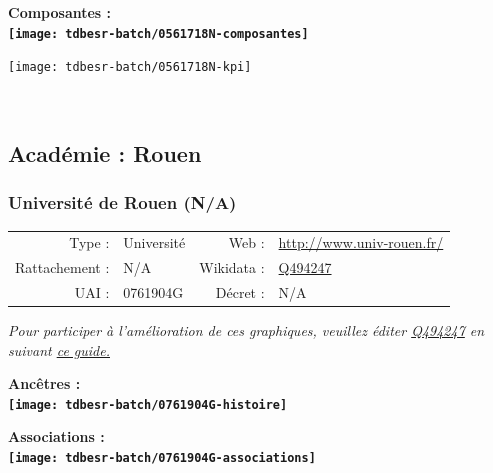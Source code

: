 \documentclass[12pt,french,]{article}
\begin{document}
\begin{center} \bf Composantes : \\  
\texttt{[image: tdbesr-batch/0561718N-composantes]} \end{center}

\begin{center}\texttt{[image: tdbesr-batch/0561718N-kpi]} \end{center}\checkoddpage

\ifoddpage ~\newpage \fi   

\hypertarget{acaduxe9mie-rouen}{%
\subsection{Académie : Rouen}\label{acaduxe9mie-rouen}}

\hypertarget{universituxe9-de-rouen-na}{%
\subsubsection{Université de Rouen
(N/A)}\label{universituxe9-de-rouen-na}}

\begin{tabular*}{\textwidth}{rp{5cm}rl}  
\hline  
Type : & Université & Web : &\href{http://www.univ-rouen.fr/}{http://www.univ-rouen.fr/} \\  
Rattachement : & N/A & Wikidata : & \href{https://www.wikidata.org/entity/Q494247}{Q494247} \\  
UAI : & 0761904G & Décret : & N/A \\  
\hline  
\end{tabular*}

\textit{\scriptsize Pour participer à l'amélioration de ces graphiques, veuillez éditer  \href{https://www.wikidata.org/entity/Q494247}{Q494247}  en suivant \href{https://github.com/cpesr/wikidataESR/blob/master/Rmd/wikidataESR.md}{ce guide.}}

\vspace{1cm}  
\begin{minipage}[b]{0.50\textwidth}\begin{center} \bf Ancêtres : \\  
\texttt{[image: tdbesr-batch/0761904G-histoire]} \end{center}\end{minipage}\begin{minipage}[b]{0.50\textwidth}\begin{center} \bf Associations : \\  
\texttt{[image: tdbesr-batch/0761904G-associations]} \end{center}\end{minipage}
\end{document}
